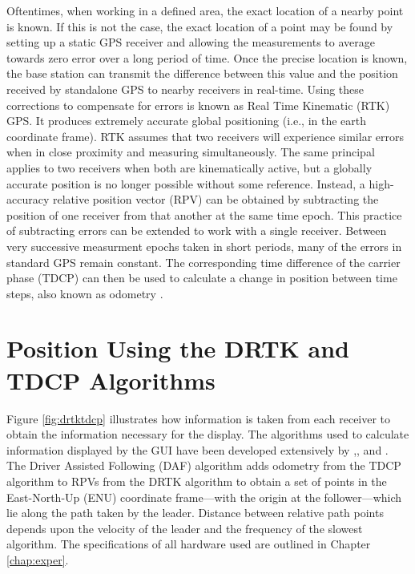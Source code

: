 \documentclass[12pt]{report}
\begin{document}
Oftentimes, when working in a defined area, the exact location of a nearby point is known. If this is not the case, the exact location of a point may be found by setting up a static GPS receiver and allowing the measurements to average towards zero error over a long period of time. Once the precise location is known, the base station can transmit the difference between this value and the position received by standalone GPS to nearby receivers in real-time. Using these corrections to compensate for errors is known as Real Time Kinematic (RTK) GPS. It produces extremely accurate global positioning (i.e., in the earth coordinate frame).
RTK assumes that two receivers will experience similar errors when in close proximity and measuring simultaneously. The same principal applies to two receivers when both are kinematically active, but a globally accurate position is no longer possible without some reference. Instead, a high-accuracy relative position vector (RPV) can be obtained by subtracting the position of one receiver from that another at the same time epoch.
This practice of subtracting errors can be extended to work with a single receiver. Between very successive measurment epochs taken in short periods, many of the errors in standard GPS remain constant. The corresponding time difference of the carrier phase (TDCP) can then be used to calculate a change in position between time steps, also known as odometry \cite{travisdiss}.


\section{Position Using the DRTK and TDCP Algorithms}
Figure \ref{fig:drtktdcp} illustrates how information is taken from each receiver to obtain the information necessary for the display. The algorithms used to calculate information displayed by the GUI have been developed extensively by \cite{scottthesis},\cite{travisshort}, \cite{travisconvoy} and \cite{travisdiss}. The Driver Assisted Following (DAF) algorithm adds odometry from the TDCP algorithm to RPVs from the DRTK algorithm to obtain a set of points in the East-North-Up (ENU) coordinate frame---with the origin at the follower---which lie along the path taken by the leader. Distance between relative path points depends upon the velocity of the leader and the frequency of the slowest algorithm. The specifications of all hardware used are outlined in Chapter \ref{chap:exper}.
\end{document}

